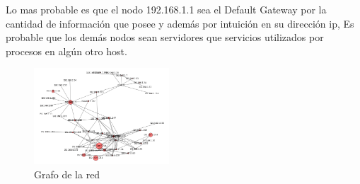 Lo mas probable es que el nodo 192.168.1.1 sea el Default Gateway por la cantidad de información que posee
y además por intuición en su dirección ip, 
Es probable que los demás nodos sean servidores que servicios utilizados por procesos en algún otro host.

\begin{figure}[H]
  \centering
    \includegraphics[width=0.45\textwidth]{grafico3-red-taringa.png}
  \caption{Grafo de la red}
  \label{grafo-taringa}
\end{figure}
